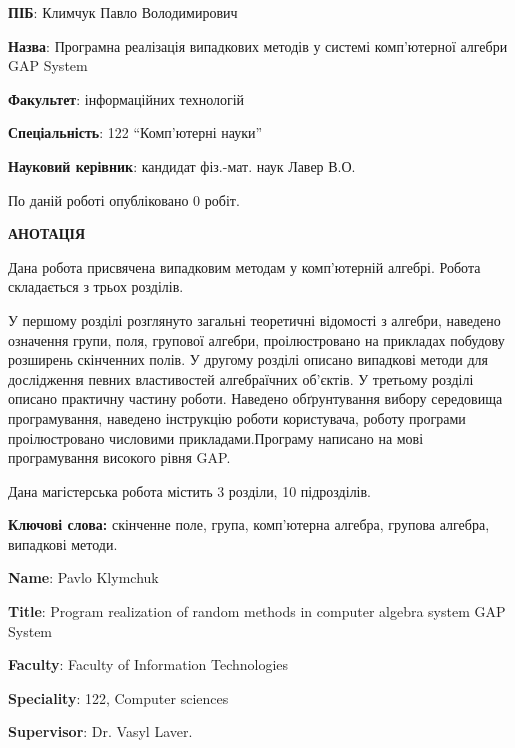 
\textbf{ПІБ}: Климчук Павло Володимирович

\textbf{Назва}: Програмна реалізація випадкових методів у системі комп'ютерної алгебри GAP System

\textbf{Факультет}: інформаційних технологій

\textbf{Спеціальність}: 122 ``Комп'ютерні науки''

\textbf{Науковий керівник}: кандидат фіз.-мат. наук Лавер В.О.

По даній роботі опубліковано $0$ робіт.

\begin{center}
\textbf{АНОТАЦІЯ}
\end{center}


Дана робота присвячена випадковим методам у комп'ютерній алгебрі. Робота складається з трьох розділів. 

У першому розділі розглянуто загальні теоретичні відомості з алгебри, наведено означення групи, поля, групової алгебри, проілюстровано на прикладах побудову розширень скінченних полів. У другому розділі описано випадкові методи для дослідження певних властивостей алгебраїчних об'єктів. У третьому розділі описано практичну частину роботи. Наведено обґрунтування вибору середовища програмування, наведено інструкцію роботи користувача, роботу програми проілюстровано числовими прикладами.Програму написано на мові програмування високого рівня GAP.

Дана магістерська робота містить 3 розділи, 10 підрозділів.

{\bf Ключові слова:} скінченне поле, група, комп'ютерна алгебра, групова алгебра, випадкові методи.

\newpage

\textbf{Name}: Pavlo Klymchuk

\textbf{Title}: Program realization of random methods in computer algebra system GAP System

\textbf{Faculty}: Faculty of Information Technologies

\textbf{Speciality}: 122, Computer sciences

\textbf{Supervisor}: Dr. Vasyl Laver. 

